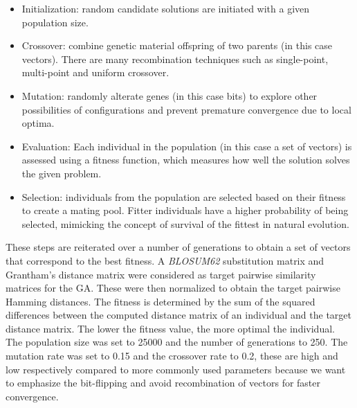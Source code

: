 \begin{itemize}
    \item Initialization: random candidate solutions are initiated with a given population size.
    \item Crossover: combine genetic material offspring of two parents (in this case vectors). There are many recombination techniques such as single-point, multi-point and uniform crossover.
    \item Mutation: randomly alterate genes (in this case bits) to explore other possibilities of configurations and prevent premature convergence due to local optima.
    \item Evaluation: Each individual in the population (in this case a set of vectors) is assessed using a fitness function, which measures how well the solution solves the given problem.
    \item Selection: individuals from the population are selected based on their fitness to create a mating pool. Fitter individuals have a higher probability of being selected, mimicking the concept of survival of the fittest in natural evolution.
\end{itemize}
These steps are reiterated over a number of generations to obtain a set of vectors that correspond to the best fitness. A \textit{BLOSUM62} substitution matrix \cite{blosum} and Grantham's distance matrix \cite{aa_evolution} were considered as target pairwise similarity matrices for the GA. These were then normalized to obtain the target pairwise Hamming distances. The fitness is determined by the sum of the squared differences between the computed distance matrix of an individual and the target distance matrix. The lower the fitness value, the more optimal the individual. The population size was set to 25000 and the number of generations to 250. The mutation rate was set to 0.15 and the crossover rate to 0.2, these are high and low respectively compared to more commonly used parameters because we want to emphasize the bit-flipping and avoid recombination of vectors for faster convergence.
